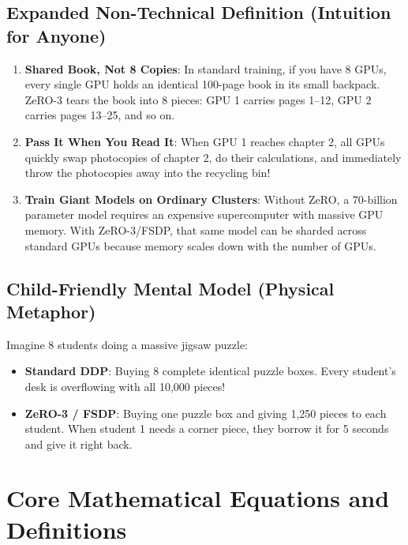 \documentclass[11pt,a4paper]{article}
\theoremstyle{definition}
\begin{document}
\subsection{Expanded Non-Technical Definition (Intuition for Anyone)}
\begin{enumerate}
    \item \textbf{Shared Book, Not 8 Copies}: In standard training, if you have 8 GPUs, every single GPU holds an identical 100-page book in its small backpack. ZeRO-3 tears the book into 8 pieces: GPU 1 carries pages 1–12, GPU 2 carries pages 13–25, and so on.
    \item \textbf{Pass It When You Read It}: When GPU 1 reaches chapter 2, all GPUs quickly swap photocopies of chapter 2, do their calculations, and immediately throw the photocopies away into the recycling bin!
    \item \textbf{Train Giant Models on Ordinary Clusters}: Without ZeRO, a 70-billion parameter model requires an expensive supercomputer with massive GPU memory. With ZeRO-3/FSDP, that same model can be sharded across standard GPUs because memory scales down with the number of GPUs.
\end{enumerate}

\subsection{Child-Friendly Mental Model (Physical Metaphor)}
Imagine 8 students doing a massive jigsaw puzzle:
\begin{itemize}
    \item \textbf{Standard DDP}: Buying 8 complete identical puzzle boxes. Every student's desk is overflowing with all 10,000 pieces!
    \item \textbf{ZeRO-3 / FSDP}: Buying one puzzle box and giving 1,250 pieces to each student. When student 1 needs a corner piece, they borrow it for 5 seconds and give it right back.
\end{itemize}

\section{Core Mathematical Equations and Definitions}
\end{document}
